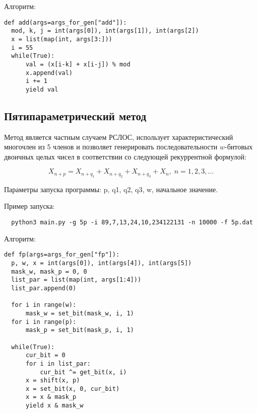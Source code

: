 \documentclass[spec, och, labwork]{shiza}
\begin{document}
Алгоритм:
\begin{small}
\begin{verbatim}
def add(args=args_for_gen["add"]):
  mod, k, j = int(args[0]), int(args[1]), int(args[2])
  x = list(map(int, args[3:]))
  i = 55
  while(True):
      val = (x[i-k] + x[i-j]) % mod
      x.append(val)
      i += 1
      yield val
\end{verbatim}
\end{small}



\subsection{Пятипараметрический метод}

Метод является частным случаем РСЛОС, использует характеристический многочлен из 5 членов и позволяет генерировать последовательности $w$-битовых двоичных целых чисел в соответствии со следующей рекуррентной 
формулой:

\begin{equation}
  X_{n + p} = X_{n + q_1} + X_{n + q_2} + X_{n + q_3} + X_n, \; n = 1, 2, 3, \dots
\end{equation}

Параметры запуска программы: p, q1, q2, q3, w, начальное значение.

Пример запуска:
\begin{small}
\begin{verbatim}
  python3 main.py -g 5p -i 89,7,13,24,10,234122131 -n 10000 -f 5p.dat
\end{verbatim}
\end{small}

Алгоритм:
\begin{small}
\begin{verbatim}
def fp(args=args_for_gen["fp"]):
  p, w, x = int(args[0]), int(args[4]), int(args[5])
  mask_w, mask_p = 0, 0
  list_par = list(map(int, args[1:4]))
  list_par.append(0)

  for i in range(w):
      mask_w = set_bit(mask_w, i, 1)
  for i in range(p):
      mask_p = set_bit(mask_p, i, 1)

  while(True):
      cur_bit = 0
      for i in list_par:
          cur_bit ^= get_bit(x, i)
      x = shift(x, p)
      x = set_bit(x, 0, cur_bit)
      x = x & mask_p
      yield x & mask_w
\end{verbatim}
\end{small}
\end{document}

